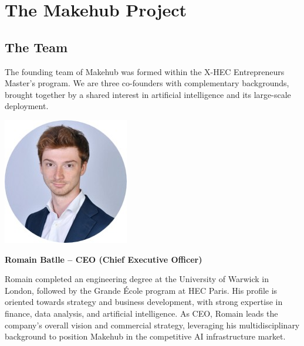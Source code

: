 \documentclass[english]{article}
\begin{document}

\newpage
\section{The Makehub Project}

\subsection{The Team}

The founding team of Makehub was formed within the X-HEC Entrepreneurs Master's program.
We are three co-founders with complementary backgrounds, brought together by a shared interest in artificial intelligence and its large-scale deployment.

\vspace{1.5em}

\noindent
\begin{minipage}[c]{0.2\textwidth}
    \centering
    \includegraphics[width=0.9\linewidth]{images/romain.jpg}
\end{minipage}%
\hfill
\begin{minipage}[c]{0.75\textwidth}
    \textbf{\large Romain Batlle – CEO (Chief Executive Officer)}
    \vspace{0.3em}

    \noindent Romain completed an engineering degree at the University of Warwick in London, followed by the Grande École program at HEC Paris.
    His profile is oriented towards strategy and business development, with strong expertise in finance, data analysis, and artificial intelligence.
    As CEO, Romain leads the company's overall vision and commercial strategy, leveraging his multidisciplinary background to position Makehub in the competitive AI infrastructure market.
\end{minipage}
\end{document}
